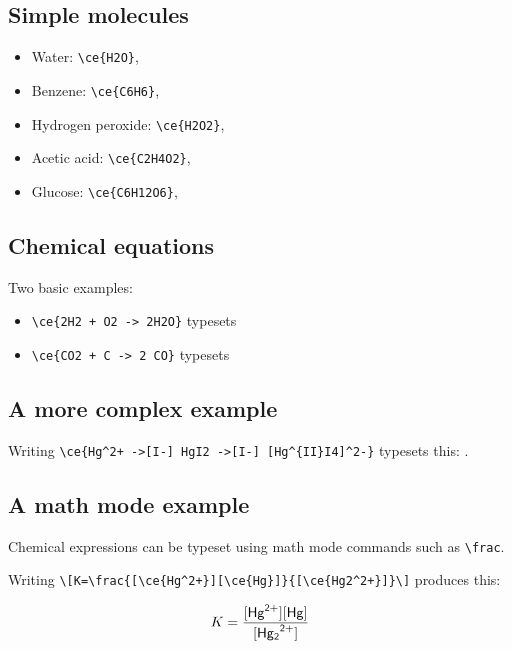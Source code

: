 \documentclass{article}
\begin{document}
	\subsection*{Simple molecules}
	
	\begin{itemize}
		\item Water: \verb||, \ce{H2O}
		\item Benzene: \verb||, \ce{C6H6}
		\item Hydrogen peroxide: \verb||, \ce{H2O2}
		\item Acetic acid: \verb||, \ce{C2H4O2}
		\item Glucose: \verb||, \ce{C6H12O6}
	\end{itemize}
	
	\subsection*{Chemical equations}
	
	Two basic examples:
	
	\begin{itemize}
		\item \verb|| typesets \ce{2H2 + O2 -> 2H2O}
		\item \verb|| typesets \ce{CO2 + C -> 2 CO}
	\end{itemize}
	
	\subsection*{A more complex example}
	
	Writing \verb|\ce{Hg^2+ ->[I-] HgI2 ->[I-] [Hg^{II}I4]^2-}| typesets this:\vskip10pt
	\noindent {}.
	
	\subsection*{A math mode example}
	
	Chemical expressions can be typeset using math mode commands such as \verb|\frac|. \vskip10pt
	
	\noindent Writing \verb|\[K=\frac{[\ce{Hg^2+}][\ce{Hg}]}{[\ce{Hg2^2+}]}\]| produces this:
	
	\[K=\frac{[\ce{Hg^2+}][\ce{Hg}]}{[\ce{Hg2^2+}]}\]
\end{document}
